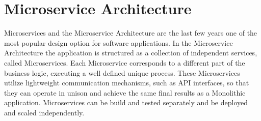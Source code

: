 \documentclass{article}
\begin{document}
\section{Microservice Architecture}

Microservices and the Microservice Architecture are the last few years one of the most popular design option for software applications. In the Microservice Architecture the application is structured as a collection of independent services, called Microservices. Each Microservice corresponds to a different part of the business logic, executing a well defined unique process\cite{monovsmicro}\cite{microservicesdef}. These Microservices utilize lightweight communication mechanisms, such as API interfaces, so that they can operate in unison and achieve the same final results as a Monolithic application. Microservices can be build and tested separately and be deployed and scaled independently. 



\end{document}
